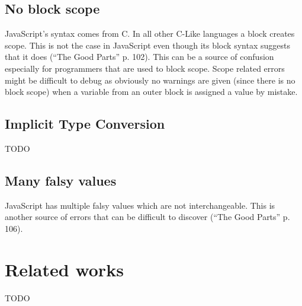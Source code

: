 	\subsection{No block scope} %
	\label{sub:no_block_scope}
		JavaScript’s syntax comes from C. In all other C-Like languages a block creates scope. This is not the case in JavaScript even though its block syntax suggests that it does (“The Good Parts” p. 102). This can be a source of confusion especially for programmers that are used to block scope. Scope related errors might be difficult to debug as obviously no warnings are given (since there is no block scope) when a variable from an outer block is assigned a value by mistake.

	\subsection{Implicit Type Conversion} %
	\label{sub:implicit_type_conversion}
	TODO

	\subsection{Many falsy values} %
	\label{sub:many_falsy_values}
		JavaScript has multiple falsy values which are not interchangeable. This is another source of errors that can be difficult to discover (“The Good Parts” p. 106).

\section{Related works} %
\label{sec:related_works}
TODO

